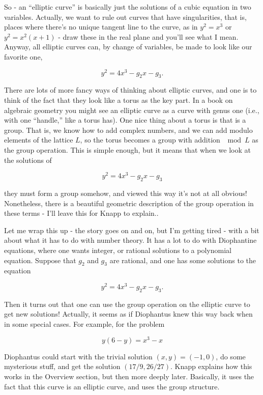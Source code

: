 \documentclass{article}
\begin{document}
So - an ``elliptic curve'' is basically just the solutions of a cubic
equation in two variables. Actually, we want to rule out curves that
have singularities, that is, places where there's no unique tangent line
to the curve, as in \(y^2 = x^3\) or \(y^2 = x^2(x+1)\) - draw these in
the real plane and you'll see what I mean. Anyway, all elliptic curves
can, by change of variables, be made to look like our favorite one,

\[y^2 = 4x^3 - g_2 x - g_3.\]

There are lots of more fancy ways of thinking about elliptic curves, and
one is to think of the fact that they look like a torus as the key part.
In a book on algebraic geometry you might see an elliptic curve as a
curve with genus one (i.e., with one ``handle,'' like a torus has). One
nice thing about a torus is that is a group. That is, we know how to add
complex numbers, and we can add modulo elements of the lattice \(L\), so
the torus becomes a group with addition \(\mod L\) as the group
operation. This is simple enough, but it means that when we look at the
solutions of

\[y^2 = 4x^3 - g_2 x - g_3\]

they must form a group somehow, and viewed this way it's not at all
obvious! Nonetheless, there is a beautiful geometric description of the
group operation in these terms - I'll leave this for Knapp to explain..

Let me wrap this up - the story goes on and on, but I'm getting tired -
with a bit about what it has to do with number theory. It has a lot to
do with Diophantine equations, where one wants integer, or rational
solutions to a polynomial equation. Suppose that \(g_2\) and \(g_3\) are
rational, and one has some solutions to the equation

\[y^2 = 4x^3 - g_2 x - g_3.\]

Then it turns out that one can use the group operation on the elliptic
curve to get new solutions! Actually, it seems as if Diophantus knew
this way back when in some special cases. For example, for the problem

\[y(6 - y) = x^3 - x\]

Diophantus could start with the trivial solution \((x,y) = (-1,0)\), do
some mysterious stuff, and get the solution \((17/9,26/27)\). Knapp
explains how this works in the Overview section, but then more deeply
later. Basically, it uses the fact that this curve is an elliptic curve,
and uses the group structure.
\end{document}
